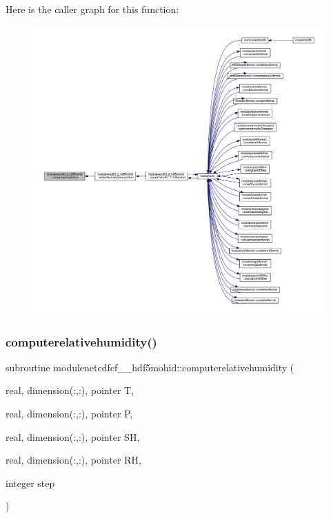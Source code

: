 Here is the caller graph for this function\+:\nopagebreak
\begin{figure}[H]
\begin{center}
\leavevmode
\includegraphics[width=350pt]{namespacemodulenetcdfcf__2__hdf5mohid_acd498610133c943ab2fe7e2cfc7c69e1_icgraph}
\end{center}
\end{figure}
\mbox{\label{namespacemodulenetcdfcf__2__hdf5mohid_a7f79a0cd0ca5a26cabb89d21e7a2daf4}} 
\subsubsection{\texorpdfstring{computerelativehumidity()}{computerelativehumidity()}}
{\footnotesize\ttfamily subroutine modulenetcdfcf\+\_\+\_\+hdf5mohid\+::computerelativehumidity (\begin{DoxyParamCaption}\item[{real, dimension(\+:,\+:), pointer}]{T,  }\item[{real, dimension(\+:,\+:), pointer}]{P,  }\item[{real, dimension(\+:,\+:), pointer}]{SH,  }\item[{real, dimension(\+:,\+:), pointer}]{RH,  }\item[{integer}]{step }\end{DoxyParamCaption})\hspace{0.3cm}{\ttfamily [private]}}

